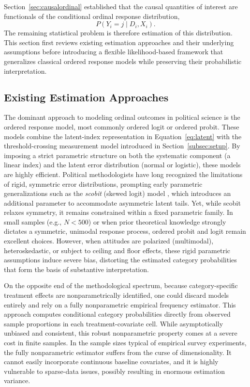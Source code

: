 \documentclass{article}
\begin{document}
Section~\ref{sec:causalordinal} established that the causal quantities of interest are functionals of the conditional ordinal response distribution,
\[
P(Y_i=j\mid D_i,X_i).
\]
The remaining statistical problem is therefore estimation of this distribution. This section first reviews existing estimation approaches and their underlying assumptions before introducing a flexible likelihood-based framework that generalizes classical ordered response models while preserving their probabilistic interpretation.

\subsection{Existing Estimation Approaches}
\label{subsec:existing}

The dominant approach to modeling ordinal outcomes in political science is the ordered response model, most commonly ordered logit or ordered probit. These models combine the latent-index representation in Equation~\eqref{eq:latent} with the threshold-crossing measurement model introduced in Section~\ref{subsec:setup}. By imposing a strict parametric structure on both the systematic component (a linear index) and the latent error distribution (normal or logistic), these models are highly efficient. Political methodologists have long recognized the limitations of rigid, symmetric error distributions, prompting early parametric generalizations such as the \textit{scobit} (skewed logit) model \citep{Nagler1994a}, which introduces an additional parameter to accommodate asymmetric latent tails. Yet, while scobit relaxes symmetry, it remains constrained within a fixed parametric family. In small samples (e.g., $N < 500$) or when prior theoretical knowledge strongly dictates a symmetric, unimodal response process, ordered probit and logit remain excellent choices. However, when attitudes are polarized (multimodal), heteroskedastic, or subject to ceiling and floor effects, these rigid parametric assumptions induce severe bias, distorting the estimated category probabilities that form the basis of substantive interpretation.

On the opposite end of the methodological spectrum, because category-specific treatment effects are nonparametrically identified, one could discard models entirely and rely on a fully nonparametric empirical frequency estimator. This approach computes conditional category probabilities directly from observed sample proportions in each treatment-covariate cell. While asymptotically unbiased and consistent, this robust nonparametric property comes at a severe cost in finite samples. In the sample sizes typical of empirical survey experiments, the fully nonparametric estimator suffers from the curse of dimensionality. It cannot easily incorporate continuous baseline covariates, and it is highly vulnerable to sparse-data issues, possibly resulting in enormous estimation variance. 
\end{document}

